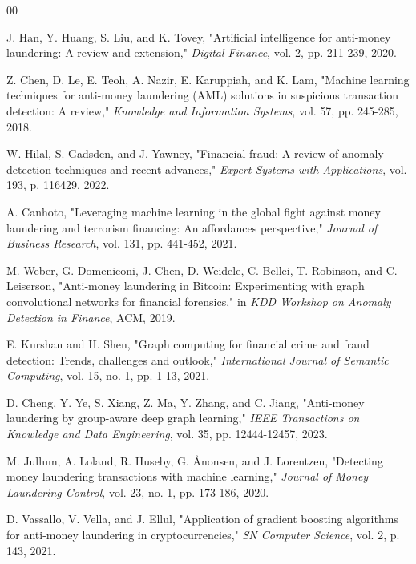 \documentclass[conference]{IEEEtran}
\begin{document}
\begin{thebibliography}{00}

 J. Han, Y. Huang, S. Liu, and K. Tovey, "Artificial intelligence for anti-money laundering: A review and extension," \textit{Digital Finance}, vol. 2, pp. 211-239, 2020.

 Z. Chen, D. Le, E. Teoh, A. Nazir, E. Karuppiah, and K. Lam, "Machine learning techniques for anti-money laundering (AML) solutions in suspicious transaction detection: A review," \textit{Knowledge and Information Systems}, vol. 57, pp. 245-285, 2018.

 W. Hilal, S. Gadsden, and J. Yawney, "Financial fraud: A review of anomaly detection techniques and recent advances," \textit{Expert Systems with Applications}, vol. 193, p. 116429, 2022.

 A. Canhoto, "Leveraging machine learning in the global fight against money laundering and terrorism financing: An affordances perspective," \textit{Journal of Business Research}, vol. 131, pp. 441-452, 2021.

 M. Weber, G. Domeniconi, J. Chen, D. Weidele, C. Bellei, T. Robinson, and C. Leiserson, "Anti-money laundering in Bitcoin: Experimenting with graph convolutional networks for financial forensics," in \textit{KDD Workshop on Anomaly Detection in Finance}, ACM, 2019.

 E. Kurshan and H. Shen, "Graph computing for financial crime and fraud detection: Trends, challenges and outlook," \textit{International Journal of Semantic Computing}, vol. 15, no. 1, pp. 1-13, 2021.

 D. Cheng, Y. Ye, S. Xiang, Z. Ma, Y. Zhang, and C. Jiang, "Anti-money laundering by group-aware deep graph learning," \textit{IEEE Transactions on Knowledge and Data Engineering}, vol. 35, pp. 12444-12457, 2023.

 M. Jullum, A. Loland, R. Huseby, G. Ånonsen, and J. Lorentzen, "Detecting money laundering transactions with machine learning," \textit{Journal of Money Laundering Control}, vol. 23, no. 1, pp. 173-186, 2020.

 D. Vassallo, V. Vella, and J. Ellul, "Application of gradient boosting algorithms for anti-money laundering in cryptocurrencies," \textit{SN Computer Science}, vol. 2, p. 143, 2021.


\end{thebibliography}
\end{document}
